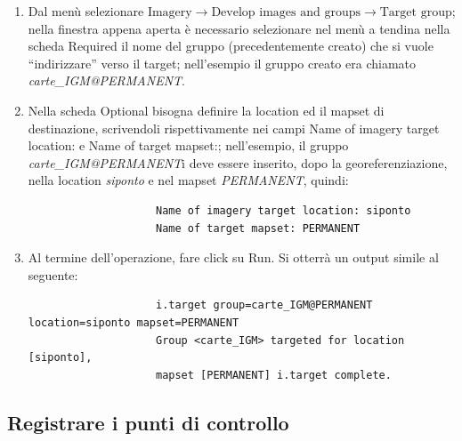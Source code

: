 			\begin{enumerate}
				\item Dal menù selezionare \textsf{$\text{Imagery}\rightarrow\text{Develop~images~and~groups}\rightarrow\text{Target~group}$}; nella finestra appena aperta è necessario selezionare nel menù a tendina nella scheda \textsf{Required} il nome del gruppo (precedentemente creato) che si vuole ``indirizzare'' verso il target; nell'esempio il gruppo creato era chiamato \emph{carte\_IGM@PERMANENT}.
				\item Nella scheda \textsf{Optional} bisogna definire la location ed il mapset di destinazione, scrivendoli rispettivamente nei campi \textsf{Name of imagery target location:} e \textsf{Name of target mapset:}; nell'esempio, il gruppo \emph{carte\_IGM@PERMANENT}i deve essere inserito, dopo la georeferenziazione, nella location \emph{siponto} e nel mapset \emph{PERMANENT}, quindi:

				\begin{verbatim}
					Name of imagery target location: siponto
					Name of target mapset: PERMANENT
				\end{verbatim}
				
				\item Al termine dell'operazione, fare click su \textsf{Run}. Si otterrà un output simile al seguente:

				\begin{verbatim}
					i.target group=carte_IGM@PERMANENT location=siponto mapset=PERMANENT
					Group <carte_IGM> targeted for location [siponto],
					mapset [PERMANENT] i.target complete.
				\end{verbatim}
			\end{enumerate}

	\subsection{Registrare i punti di controllo}
	
